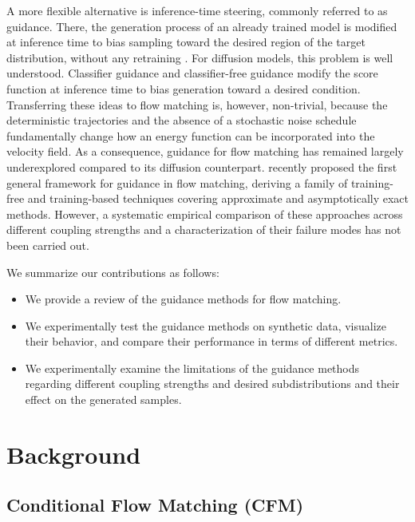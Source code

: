 \documentclass{article}
\begin{document}
A more flexible alternative is inference-time steering, commonly referred to as guidance.
There, the generation process of an already trained model is modified at inference time to bias sampling toward the desired region of the target distribution, without any retraining \citep{dhariwal2021diffusion, feng25s_guidance}.
For diffusion models, this problem is well understood.
Classifier guidance \citep{dhariwal2021diffusion} and classifier-free guidance \citep{ho2022classifier} modify the score function at inference time to bias generation toward a desired condition.
Transferring these ideas to flow matching is, however, non-trivial, because the deterministic trajectories and the absence of a stochastic noise schedule fundamentally change how an energy function can be incorporated into the velocity field.
As a consequence, guidance for flow matching has remained largely underexplored compared to its diffusion counterpart.
\citet{feng25s_guidance} recently proposed the first general framework for guidance in flow matching, deriving a family of training-free and training-based techniques covering approximate and asymptotically exact methods.
However, a systematic empirical comparison of these approaches across different coupling strengths and a characterization of their failure modes has not been carried out.


We summarize our contributions as follows:
\begin{itemize}[nosep]
\item We provide a review of the guidance methods for flow matching.
\item We experimentally test the guidance methods on synthetic data, visualize their behavior, and compare their performance in terms of different metrics.
\item We experimentally examine the limitations of the guidance methods regarding different coupling strengths and desired subdistributions and their effect on the generated samples.
\end{itemize}

\section{Background}

\subsection{Conditional Flow Matching (CFM)}
\end{document}
